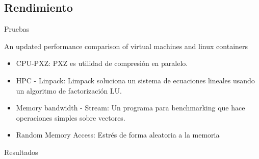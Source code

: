 \documentclass[compress]{beamer}
\begin{document}
\subsection{Rendimiento}



\begin{frame}{Pruebas}

An updated performance comparison of virtual machines and linux containers \cite{felter2014updated}
\begin{itemize}
	\item CPU-PXZ: PXZ es utilidad de compresión en paralelo. 
	\item HPC - Linpack: Limpack soluciona un sistema de ecuaciones lineales usando un algoritmo de factorización LU.
	\item Memory bandwidth - Stream: Un programa para benchmarking que hace operaciones simples sobre vectores.
	\item Random Memory Access: Estrés de forma aleatoria a la memoria 
\end{itemize}
\end{frame}

\begin{frame}{Resultados}
\begin{table}[h]
\centering
{}
\caption{Resultados}

\end{table}
\end{frame}
\end{document}
